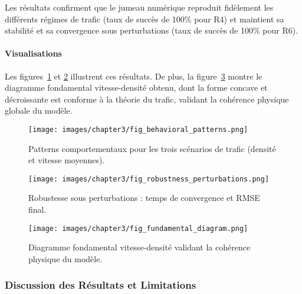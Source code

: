 Les résultats confirment que le jumeau numérique reproduit fidèlement les différents régimes de trafic (taux de succès de 100\% pour R4) et maintient sa stabilité et sa convergence sous perturbations (taux de succès de 100\% pour R6).

\paragraph{Visualisations}

Les figures~\ref{fig:behavioral_patterns} et \ref{fig:robustness_perturbations} illustrent ces résultats. De plus, la figure~\ref{fig:fundamental_diagram} montre le diagramme fondamental vitesse-densité obtenu, dont la forme concave et décroissante est conforme à la théorie du trafic, validant la cohérence physique globale du modèle.

\begin{figure}[htbp]
    \centering
    \texttt{[image: images/chapter3/fig\_behavioral\_patterns.png]}
    \caption{Patterns comportementaux pour les trois scénarios de trafic (densité et vitesse moyennes).}
    \label{fig:behavioral_patterns}
\end{figure}

\begin{figure}[htbp]
    \centering
    \texttt{[image: images/chapter3/fig\_robustness\_perturbations.png]}
    \caption{Robustesse sous perturbations : temps de convergence et RMSE final.}
    \label{fig:robustness_perturbations}
\end{figure}

\begin{figure}[htbp]
    \centering
    \texttt{[image: images/chapter3/fig\_fundamental\_diagram.png]}
    \caption{Diagramme fondamental vitesse-densité validant la cohérence physique du modèle.}
    \label{fig:fundamental_diagram}
\end{figure}

\subsubsection{Discussion des Résultats et Limitations}
\label{subsec:resultats_jumeau}

